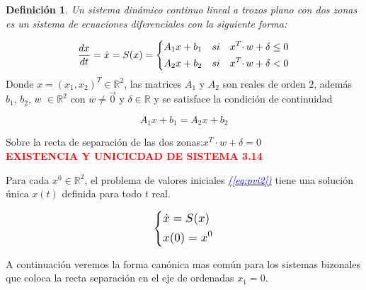\documentclass[12pt,a4paper]{report} %
\newtheorem{definicion}{Definición} %
\newcommand{\eref}[1]{\hyperref[#1]{\textcolor{blue}{\textit{(\ref*{#1})}}}}
\begin{document}
	\begin{definicion}
		Un sistema dinámico continuo lineal a trozos plano con dos zonas es un sistema de ecuaciones diferenciales con la siguiente forma:
	\end{definicion}
	
	\begin{equation}
		\frac{dx}{dt}=\dot{x}=S(x)=
		\label{eq:biz1}
		\scalebox{1}{$\displaystyle
			\left\{
			\begin{aligned}
			 A_1x+b_1\quad si \quad x^T\cdotp w+\delta \leq 0 \\
			 A_2x+b_2\quad si \quad x^T\cdotp w+\delta < 0
			\end{aligned}
			\right.
			$}
	\end{equation}\smallskip
	Donde $x=(x_1,x_2)^T\in \mathbb{R}^2$, las matrices $A_1$ y $A_2$ son reales de orden $2$, además\\ $b_1$, $b_2$, $w$ $\in \mathbb{R}^2$ con $w\neq\vec{0}$ y $\delta \in \mathbb{R}$ y se satisface la condición de continuidad
	
	\begin{equation}
		A_1x+b_1=A_2x+b_2 
	\end{equation}\smallskip
	
	Sobre la recta de separación de las dos zonas:\quad $x^T\cdotp w+\delta = 0$ \\[0.5cm]
	
	\textbf{\textcolor{red}{EXISTENCIA Y UNICICDAD DE SISTEMA 3.14}}

	Para cada $x^0 \in \mathbb{R}^2$, el problema de valores iniciales \eref{eq:pvi2} tiene una solución única $x(t)$ definida para todo $t$ real.
	
	\begin{equation}
		\label{eq:pvi2}
		\scalebox{1.2}{$\displaystyle
			\left\{
			\begin{aligned}
				&\dot{x}=S(x)\\
				&x(0)=x^0
			\end{aligned}
			\right.
			$}
	\end{equation}\smallskip
	
	 A continuación veremos la forma canónica mas común para los sistemas bizonales que coloca la recta separación en el eje de ordenadas $x_1=0$.
	
\end{document}
